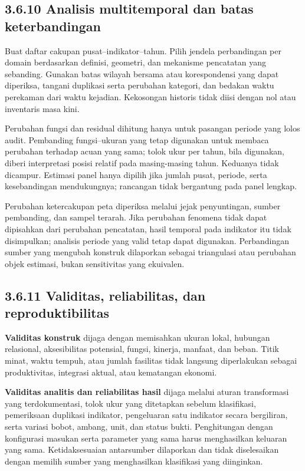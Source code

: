 \documentclass[
  indonesian,
  11pt,
  a4paper,
  oneside,
  openany]{report}
\begin{document}
\subsection{3.6.10 Analisis multitemporal dan batas
keterbandingan}\label{analisis-multitemporal-dan-batas-keterbandingan}

Buat daftar cakupan pusat--indikator--tahun. Pilih jendela perbandingan
per domain berdasarkan definisi, geometri, dan mekanisme pencatatan yang
sebanding. Gunakan batas wilayah bersama atau korespondensi yang dapat
diperiksa, tangani duplikasi serta perubahan kategori, dan bedakan waktu
perekaman dari waktu kejadian. Kekosongan historis tidak diisi dengan
nol atau inventaris masa kini.

Perubahan fungsi dan residual dihitung hanya untuk pasangan periode yang
lolos audit. Pembanding fungsi--ukuran yang tetap digunakan untuk
membaca perubahan terhadap acuan yang sama; tolok ukur per tahun, bila
digunakan, diberi interpretasi posisi relatif pada masing-masing tahun.
Keduanya tidak dicampur. Estimasi panel hanya dipilih jika jumlah pusat,
periode, serta kesebandingan mendukungnya; rancangan tidak bergantung
pada panel lengkap.

Perubahan ketercakupan peta diperiksa melalui jejak penyuntingan, sumber
pembanding, dan sampel terarah. Jika perubahan fenomena tidak dapat
dipisahkan dari perubahan pencatatan, hasil temporal pada indikator itu
tidak disimpulkan; analisis periode yang valid tetap dapat digunakan.
Perbandingan sumber yang mengubah konstruk dilaporkan sebagai
triangulasi atau perubahan objek estimasi, bukan sensitivitas yang
ekuivalen.

\subsection{3.6.11 Validitas, reliabilitas, dan
reproduktibilitas}\label{validitas-reliabilitas-dan-reproduktibilitas}

\textbf{Validitas konstruk} dijaga dengan memisahkan ukuran lokal,
hubungan relasional, aksesibilitas potensial, fungsi, kinerja, manfaat,
dan beban. Titik minat, waktu tempuh, atau jumlah fasilitas tidak
langsung diperlakukan sebagai produktivitas, integrasi aktual, atau
kematangan ekonomi.

\textbf{Validitas analitis dan reliabilitas hasil} dijaga melalui aturan
transformasi yang terdokumentasi, tolok ukur yang ditetapkan sebelum
klasifikasi, pemeriksaan duplikasi indikator, pengeluaran satu indikator
secara bergiliran, serta variasi bobot, ambang, unit, dan status bukti.
Penghitungan dengan konfigurasi masukan serta parameter yang sama harus
menghasilkan keluaran yang sama. Ketidaksesuaian antarsumber dilaporkan
dan tidak diselesaikan dengan memilih sumber yang menghasilkan
klasifikasi yang diinginkan.
\end{document}

